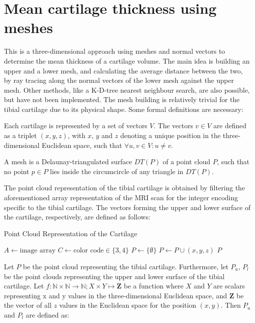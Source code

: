 \section{Mean cartilage thickness using meshes}
\label{sec:Meshes}
This is a three-dimensional approach using meshes and normal vectors to determine the mean thickness of a cartilage volume. The main idea is building an upper and a lower mesh, and calculating the average distance between the two, by ray tracing along the normal vectors of the lower mesh against the upper mesh. Other methods, like a K-D-tree nearest neighbour search, are also possible, but have not been implemented. The mesh building is relatively trivial for the tibial cartilage due to its physical shape. Some formal definitions are necessary:
\begin{theorem}
	Each cartilage is represented by a set of vectors $V$. The vectors $v \in V$ are defined as a triplet $(x, y, z)$, with $x$, $y$ and $z$ denoting a unique position in the three-dimensional Euclidean space, such that $\forall u, v \in V: u \neq v$.
\end{theorem}
\begin{theorem}[Mesh]
	A mesh is a Delaunay-triangulated surface $DT(P)$ of a point cloud $P$, such that no point $p \in P$ lies inside the circumcircle of any triangle in $DT(P)$. \cite{enwiki:delaunay} 
\end{theorem}
The point cloud representation of the tibial cartilage is obtained by filtering the aforementioned array representation of the MRI scan for the integer encoding specific to the tibial cartilage. The vectors forming the upper and lower surface of the cartilage, respectively, are defined as follows:
\begin{algorithm}
	\caption{Point Cloud Representation of the Cartilage}
	\label{algo:pointcloud}
	\begin{algorithmic}[1]
		\State $A \gets \text{image array}$
		\State $C \gets \text{color code} \in \{3,4\}$
		\State $P \gets \{\emptyset\}$
				\State $P \gets P \cup (x,y,z)$
				\State
			\EndIf
		\EndFor
		\Return $P$
		\EndProcedure
	\end{algorithmic}
\end{algorithm}
Let $P$ be the point cloud representing the tibial cartilage. Furthermore, let $P_{u}$, $P_{l}$ be the point clouds representing the upper and lower surface of the tibial cartilage. Let $f: \mathbb{N} \times \mathbb{N} \rightarrow \mathbb{N}; X \times Y \mapsto \mathbf{Z}$ be a function where $X$ and $Y$ are scalars representing x and y values in the three-dimensional Euclidean space, and $\mathbf{Z}$ be the vector of all $z$ values in the Euclidean space for the position $(x,y)$. Then $P_{u}$ and $P_{l}$ are defined as:
